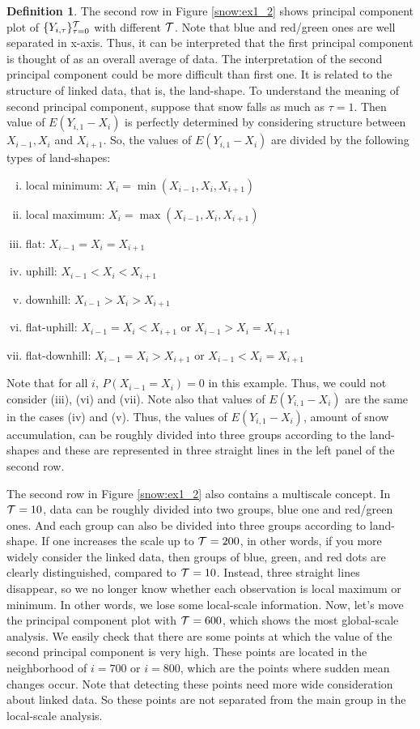 \documentclass[preprint, review, 12pt]{article}
\theoremstyle{definition}
\newtheorem{dfn}{Definition}
\theoremstyle{remark}
\begin{document}
\begin{dfn}
The second row in Figure \ref{snow:ex1_2} shows principal component plot of $\{Y_{i,\tau}\}_{\tau=0}^{\cal T}$ with different $\cal T$. Note that blue and red/green ones are well separated in x-axis. Thus, it can be interpreted that the first principal component is thought of as an overall average of data. The interpretation of the second principal component could be more difficult than first one. It is related to the structure of linked data, that is, the land-shape. To understand the meaning of second principal component, suppose that snow falls as much as $\tau=1$. Then value of $E(Y_{i,1}-X_i)$ is perfectly determined by considering structure between $X_{i-1},X_{i}$ and $X_{i+1}$. So, the values of $E(Y_{i,1}-X_i)$ are divided by the following types of land-shapes:
\begin{enumerate}[(i)]
	\item local minimum: $X_i=\min(X_{i-1},X_i,X_{i+1})$
	\item local maximum: $X_i=\max(X_{i-1},X_i,X_{i+1})$
	\item flat: $X_{i-1}=X_i=X_{i+1}$ 
	\item uphill: $X_{i-1}<X_i<X_{i+1}$
	\item downhill: $X_{i-1}>X_i>X_{i+1}$
	\item flat-uphill: $X_{i-1}=X_i<X_{i+1}$ or $X_{i-1}>X_i=X_{i+1}$
	\item flat-downhill: $X_{i-1}=X_i>X_{i+1}$ or $X_{i-1}<X_i=X_{i+1}$
\end{enumerate}
Note that for all $i$, $P(X_{i-1}=X_i)=0$ in this example. Thus, we could not consider (iii), (vi) and (vii). Note also that values of $E(Y_{i,1}-X_i)$ are the same in the cases (iv) and (v). Thus, the values of $E(Y_{i,1}-X_i)$, amount of snow accumulation, can be roughly divided into three groups according to the land-shapes and these are represented in three straight lines in the left panel of the second row. 

The second row in Figure \ref{snow:ex1_2} also contains a multiscale concept. In ${\cal T}=10$, data can be roughly divided into two groups, blue one and red/green ones. And each group can also be divided into three groups according to land-shape. If one increases the scale up to ${\cal T}=200$, in other words, if you more widely consider the linked data, then groups of blue, green, and red dots are clearly distinguished, compared to ${\cal T}=10$. Instead, three straight lines disappear, so we no longer know whether each observation is local maximum or minimum. In other words, we lose some local-scale information. Now, let's move the principal component plot with ${\cal T}=600$, which shows the most global-scale analysis. We easily check that there are some points at which the value of the second principal component is very high. These points are located in the neighborhood of $i=700$ or $i=800$, which are the points where sudden mean changes occur. Note that detecting these points need more wide consideration about linked data. So these points are not separated from the main group in the local-scale analysis. 


\end{dfn}
\end{document}
